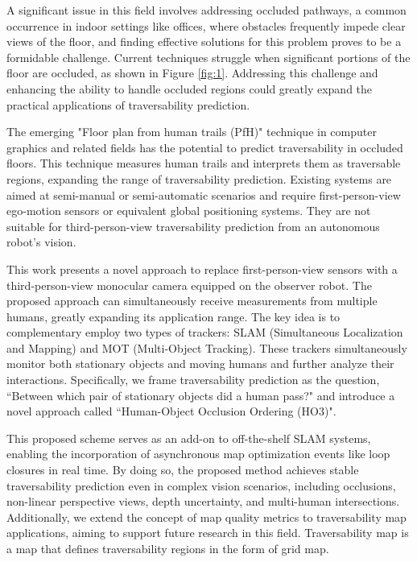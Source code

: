 \documentclass[letterpaper, 10 pt, conference]{ieeeconf}
\begin{document}
A significant issue in this field involves addressing occluded pathways, a common occurrence in indoor settings like offices, where obstacles frequently impede clear views of the floor, and finding effective solutions for this problem proves to be a formidable challenge. Current techniques struggle when significant portions of the floor are occluded, as shown in Figure \ref{fig:1}. Addressing this challenge and enhancing the ability to handle occluded regions could greatly expand the practical applications of traversability prediction.

The emerging "Floor plan from human trails (PfH)" technique in computer graphics and related fields has the potential to predict traversability in occluded floors. This technique measures human trails and interprets them as traversable regions, expanding the range of traversability prediction. Existing systems are aimed at semi-manual or semi-automatic scenarios and require first-person-view ego-motion sensors or equivalent global positioning systems. They are not suitable for third-person-view traversability prediction from an autonomous robot's vision.

\figA

This work presents a novel approach to replace first-person-view sensors with a third-person-view monocular camera equipped on the observer robot. The proposed approach can simultaneously receive measurements from multiple humans, greatly expanding its application range. The key idea is to complementary employ two types of trackers: SLAM (Simultaneous Localization and Mapping)\cite{r17} and MOT (Multi-Object Tracking)\cite{r18}. These trackers simultaneously monitor both stationary objects and moving humans and further analyze their interactions. Specifically, we frame traversability prediction as the question, ``Between which pair of stationary objects did a human pass?" and introduce a novel approach called ``Human-Object Occlusion Ordering (HO3)"\cite{r19}.

This proposed scheme serves as an add-on to off-the-shelf SLAM systems, enabling the incorporation of asynchronous map optimization events like loop closures in real time. By doing so, the proposed method achieves stable traversability prediction even in complex vision scenarios, including occlusions, non-linear perspective views, depth uncertainty, and multi-human intersections. Additionally, we extend the concept of map quality metrics to traversability map applications, aiming to support future research in this field. Traversability map is a map that defines traversability regions in the form of grid map.
\end{document}
